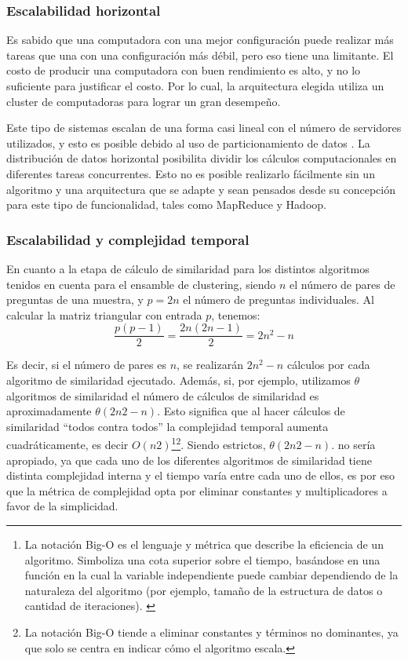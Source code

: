 \subsubsection{Escalabilidad horizontal}
Es sabido que una computadora con una mejor configuración puede realizar más tareas que una con una configuración más débil, pero eso tiene una limitante. El costo de producir una computadora con buen rendimiento es alto, y no lo suficiente para justificar el costo. Por lo cual, la arquitectura elegida utiliza un cluster de computadoras para lograr un gran desempeño.

\bigskip Este tipo de sistemas escalan de una forma casi lineal con el número de servidores utilizados, y esto es posible debido al uso de particionamiento de datos \citep{pokorny2013nosql}. La distribución de datos horizontal posibilita dividir los cálculos computacionales en diferentes tareas concurrentes. Esto no es posible realizarlo fácilmente sin un algoritmo y una arquitectura que se adapte y sean pensados desde su concepción para este tipo de funcionalidad, tales como MapReduce y Hadoop.

\subsubsection{Escalabilidad y complejidad temporal}
En cuanto a la etapa de cálculo de similaridad para los distintos algoritmos tenidos en cuenta para el ensamble de clustering, siendo \(n\) el número de pares de preguntas de una muestra, y \(p = 2n\) el número de preguntas individuales. Al calcular la matriz triangular con entrada \(p\), tenemos:
\[\frac{p(p-1)}{2} = \frac{2n(2n-1)}{2} = 2n^2-n\]

Es decir, si el número de pares es \(n\), se realizarán \(2n^2-n\) cálculos por cada algoritmo de similaridad ejecutado. Además, si, por ejemplo, utilizamos \(\theta\) algoritmos de similaridad el número de cálculos de similaridad es aproximadamente \(\theta(2n2-n)\). Esto significa que al hacer cálculos de similaridad “todos contra todos” la complejidad temporal aumenta cuadráticamente, es decir \(O(n2)\)\footnote{La notación Big-O es el lenguaje y métrica que describe la eficiencia de un algoritmo. Simboliza una cota superior sobre el tiempo, basándose en una función en la cual la variable independiente puede cambiar dependiendo de la naturaleza del algoritmo (por ejemplo, tamaño de la estructura de datos o cantidad de iteraciones). \citep{cormen2009introduction}}\footnote{La notación Big-O tiende a eliminar constantes y términos no dominantes, ya que solo se centra en indicar cómo el algoritmo escala. }. Siendo estrictos, \(\theta(2n2-n)\). no sería apropiado, ya que cada uno de los diferentes algoritmos de similaridad tiene distinta complejidad interna y el tiempo varía entre cada uno de ellos, es por eso que la métrica de complejidad opta por eliminar constantes y multiplicadores a favor de la simplicidad.


